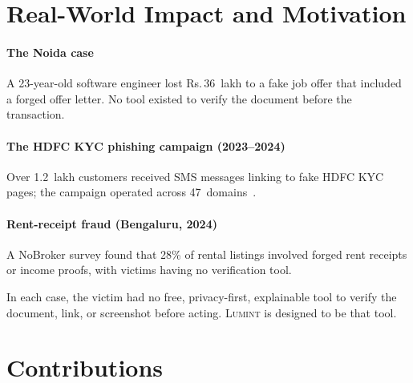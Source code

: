 \documentclass[conference]{IEEEtran}
\def\rupee{\textrm{Rs.\,}}
\begin{document}
\section{Real-World Impact and Motivation}\label{sec:motivation}

\paragraph{The Noida case}
A 23-year-old software engineer lost \rupee{}36~lakh to a fake job offer
that included a forged offer letter. No tool existed to verify the
document before the transaction.

\paragraph{The HDFC KYC phishing campaign (2023--2024)}
Over 1.2~lakh customers received SMS messages linking to fake HDFC KYC
pages; the campaign operated across 47~domains~\cite{certin2024}.

\paragraph{Rent-receipt fraud (Bengaluru, 2024)}
A NoBroker survey found that 28\% of rental listings involved forged
rent receipts or income proofs, with victims having no verification tool.

In each case, the victim had no free, privacy-first, explainable tool to
verify the document, link, or screenshot before acting.
\textsc{Lumint} is designed to be that tool.

\section{Contributions}\label{sec:contributions}
\end{document}
